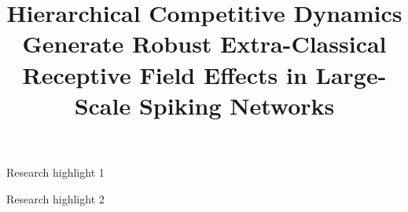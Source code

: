 \documentclass[preprint,12pt]{elsarticle}
\begin{document}
\begin{frontmatter}


\title{Hierarchical Competitive Dynamics Generate Robust Extra-Classical Receptive Field Effects in Large-Scale Spiking Networks}



\author{} %


\begin{abstract}

\end{abstract}

\begin{graphicalabstract}
\end{graphicalabstract}

\begin{highlights}
\item Research highlight 1
\item Research highlight 2
\end{highlights}

\begin{keyword}



\end{keyword}

\end{frontmatter}
\end{document}
